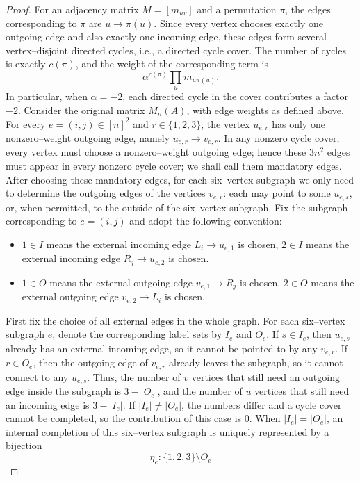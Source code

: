 \documentclass[11pt,a4paper]{article}
\begin{document}
\begin{proof}
For an adjacency matrix $M=[m_{uv}]$ and a permutation $\pi$, the edges corresponding to $\pi$ are $u\to\pi(u)$. Since every vertex chooses exactly one outgoing edge and also exactly one incoming edge, these edges form several vertex–disjoint directed cycles, i.e., a directed cycle cover. The number of cycles is exactly $c(\pi)$, and the weight of the corresponding term is
\[
  \alpha^{c(\pi)}\prod_u m_{u\pi(u)}.
\]
In particular, when $\alpha=-2$, each directed cycle in the cover contributes a factor $-2$. Consider the original matrix $M_n(A)$, with edge weights as defined above. For every $e=(i,j)\in[n]^2$ and $r\in\{1,2,3\}$, the vertex $u_{e,r}$ has only one nonzero–weight outgoing edge, namely $u_{e,r}\longrightarrow v_{e,r}$.
In any nonzero cycle cover, every vertex must choose a nonzero–weight outgoing edge; hence these $3n^2$ edges must appear in every nonzero cycle cover; we shall call them mandatory edges. After choosing these mandatory edges, for each six–vertex subgraph we only need to determine the outgoing edges of the vertices $v_{e,r}$: each may point to some $u_{e,s}$, or, when permitted, to the outside of the six–vertex subgraph. Fix the subgraph corresponding to $e=(i,j)$ and adopt the following convention:
\begin{itemize}
\item $1\in I$ means the external incoming edge $L_i\to u_{e,1}$ is chosen,
      $2\in I$ means the external incoming edge $R_j\to u_{e,2}$ is chosen.
\item $1\in O$ means the external outgoing edge $v_{e,1}\to R_j$ is chosen,
      $2\in O$ means the external outgoing edge $v_{e,2}\to L_i$ is chosen.
\end{itemize}
First fix the choice of all external edges in the whole graph. For each six–vertex subgraph $e$, denote the corresponding label sets by $I_e$ and $O_e$. If $s\in I_e$, then $u_{e,s}$ already has an external incoming edge, so it cannot be pointed to by any $v_{e,r}$. If $r\in O_e$, then the outgoing edge of $v_{e,r}$ already leaves the subgraph, so it cannot connect to any $u_{e,s}$. Thus, the number of $v$ vertices that still need an outgoing edge inside the subgraph is $3-|O_e|$, and the number of $u$ vertices that still need an incoming edge is $3-|I_e|$. If $|I_e|\ne|O_e|$, the numbers differ and a cycle cover cannot be completed, so the contribution of this case is $0$.
When $|I_e|=|O_e|$, an internal completion of this six–vertex subgraph is uniquely represented by a bijection
\[
  \eta_e:\{1,2,3\}\setminus O_e
\]
\end{proof}
\end{document}

